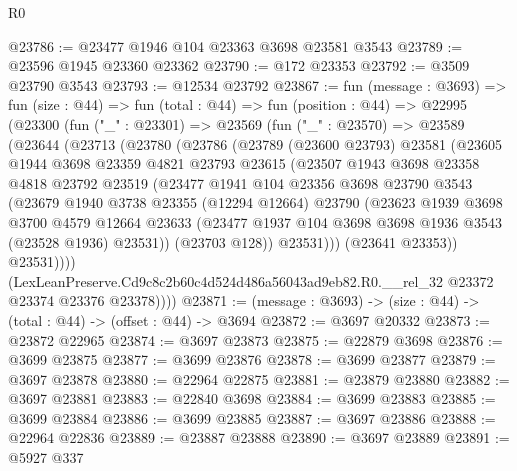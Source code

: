 \begin{lexlean}{R0}
\begin{coremodule}
@23786 := @23477 @1946 @104 @23363 @3698 @23581 @3543
@23789 := @23596 @1945 @23360 @23362
@23790 := @172 @23353
@23792 := @3509 @23790 @3543
@23793 := @12534 @23792
@23867 := fun (message : @3693) =>
  fun (size : @44) =>
  fun (total : @44) =>
  fun (position : @44) =>
  @22995
    (@23300
      (fun ("_" : @23301) =>
      @23569
        (fun ("_" : @23570) =>
        @23589
          (@23644
            (@23713
              (@23780
                (@23786
                  (@23789
                    (@23600 @23793)
                    @23581
                    (@23605
                      @1944
                      @3698
                      @23359
                      @4821
                      @23793
                      @23615
                      (@23507
                        @1943
                        @3698
                        @23358
                        @4818
                        @23792
                        @23519
                        (@23477
                          @1941
                          @104
                          @23356
                          @3698
                          @23790
                          @3543
                          (@23679
                            @1940
                            @3738
                            @23355
                            (@12294 @12664)
                            @23790
                            (@23623
                              @1939
                              @3698
                              @3700
                              @4579
                              @12664
                              @23633
                              (@23477 @1937 @104 @3698 @3698 @1936 @3543 (@23528 @1936) @23531))
                            (@23703 @128))
                          @23531)))
                    (@23641 @23353))
                  @23531))))
          (LexLeanPreserve.Cd9c8c2b60c4d524d486a56043ad9eb82.R0.__rel_32
            @23372
            @23374
            @23376
            @23378))))
@23871 := (message : @3693) -> (size : @44) -> (total : @44) -> (offset : @44) -> @3694
@23872 := @3697 @20332
@23873 := @23872 @22965
@23874 := @3697 @23873
@23875 := @22879 @3698
@23876 := @3699 @23875
@23877 := @3699 @23876
@23878 := @3699 @23877
@23879 := @3697 @23878
@23880 := @22964 @22875
@23881 := @23879 @23880
@23882 := @3697 @23881
@23883 := @22840 @3698
@23884 := @3699 @23883
@23885 := @3699 @23884
@23886 := @3699 @23885
@23887 := @3697 @23886
@23888 := @22964 @22836
@23889 := @23887 @23888
@23890 := @3697 @23889
@23891 := @5927 @337

\end{coremodule}
\end{lexlean}
